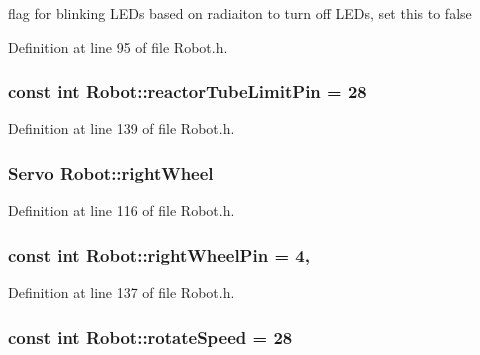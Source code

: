 flag for blinking L\-E\-Ds based on radiaiton to turn off L\-E\-Ds, set this to false 



Definition at line 95 of file Robot.\-h.

\hypertarget{classRobot_a351d754436c8f569432ef7a06641f98a}{
\subsubsection[{reactor\-Tube\-Limit\-Pin}]{\setlength{\rightskip}{0pt plus 5cm}const int Robot\-::reactor\-Tube\-Limit\-Pin = 28\hspace{0.3cm}{\ttfamily [private]}}}\label{classRobot_a351d754436c8f569432ef7a06641f98a}


Definition at line 139 of file Robot.\-h.

\hypertarget{classRobot_a3b2dd5b89e44fd3a7ba239554fb5b8a7}{
\subsubsection[{right\-Wheel}]{\setlength{\rightskip}{0pt plus 5cm}Servo Robot\-::right\-Wheel\hspace{0.3cm}{\ttfamily [private]}}}\label{classRobot_a3b2dd5b89e44fd3a7ba239554fb5b8a7}


Definition at line 116 of file Robot.\-h.

\hypertarget{classRobot_a572525b971da4e0f272f5f1259f6c84f}{
\subsubsection[{right\-Wheel\-Pin}]{\setlength{\rightskip}{0pt plus 5cm}const int Robot\-::right\-Wheel\-Pin = 4\hspace{0.3cm}{\ttfamily [static]}, {\ttfamily [private]}}}\label{classRobot_a572525b971da4e0f272f5f1259f6c84f}


Definition at line 137 of file Robot.\-h.

\hypertarget{classRobot_a4063d601b5b4d5aad332f617abb36c7b}{
\subsubsection[{rotate\-Speed}]{\setlength{\rightskip}{0pt plus 5cm}const int Robot\-::rotate\-Speed = 28\hspace{0.3cm}{\ttfamily [private]}}}\label{classRobot_a4063d601b5b4d5aad332f617abb36c7b}


